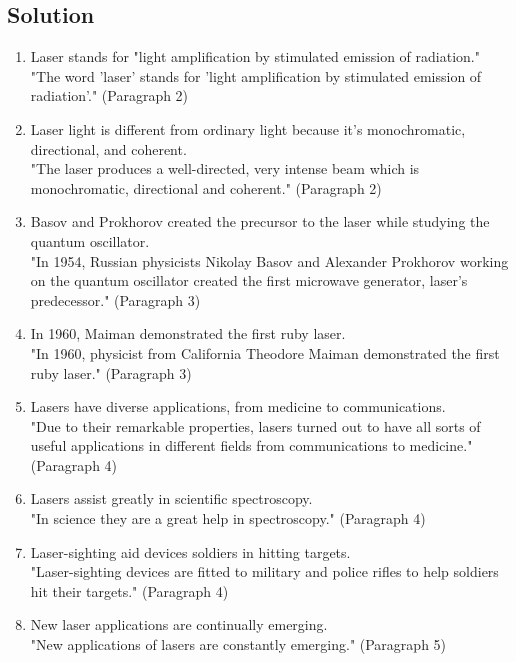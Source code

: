 \documentclass[12pt, a4paper]{report}
\begin{document}
\subsection*{Solution}
\begin{enumerate}
    \item Laser stands for "light amplification by stimulated emission of radiation." \\
          "The word 'laser' stands for 'light amplification by stimulated emission
          of radiation'." (Paragraph 2)
    \item Laser light is different from ordinary light because it's monochromatic,
          directional, and coherent. \\
          "The laser produces a well-directed, very intense beam which is monochromatic,
          directional and coherent." (Paragraph 2)
    \item Basov and Prokhorov created the precursor to the laser while studying the
          quantum oscillator. \\
          "In 1954, Russian physicists Nikolay Basov and Alexander Prokhorov working
          on the quantum oscillator created the first microwave generator, laser’s
          predecessor." (Paragraph 3)
    \item In 1960, Maiman demonstrated the first ruby laser. \\
          "In 1960, physicist from California Theodore Maiman demonstrated the first
          ruby laser." (Paragraph 3)
    \item Lasers have diverse applications, from medicine to communications. \\
          "Due to their remarkable properties, lasers turned out to have all sorts
          of useful applications in different fields from communications to medicine."
          (Paragraph 4)
    \item Lasers assist greatly in scientific spectroscopy. \\
          "In science they are a great help in spectroscopy." (Paragraph 4)
    \item Laser-sighting aid devices soldiers in hitting targets. \\
          "Laser-sighting devices are fitted to military and police rifles to help
          soldiers hit their targets." (Paragraph 4)
    \item New laser applications are continually emerging. \\
          "New applications of lasers are constantly emerging." (Paragraph 5)

\end{enumerate}
\end{document}
